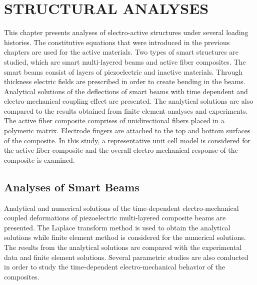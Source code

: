 %
%
%
\chapter{\uppercase{STRUCTURAL ANALYSES}}  
\label{section:structural_analyses}
This chapter presents analyses of electro-active structures under several loading histories.
The constitutive equations that were introduced in the previous chapters are used for the active materials.
Two types of smart structures are studied, which are smart multi-layered beams and active fiber composites.
The smart beams consist of layers of piezoelectric and inactive materials.
Through thickness electric fields are prescribed in order to create bending in the beams.
Analytical solutions of the deflections of smart beams with time dependent and electro-mechanical coupling effect are presented.
The analytical solutions are also compared to the results obtained from finite element analyses and experiments.
The active fiber composite comprises of unidirectional fibers placed in a polymeric matrix.
Electrode fingers are attached to the top and bottom surfaces of the composite.
In this study, a representative unit cell model is considered for the active fiber composite and the overall electro-mechanical response of the composite is examined. \\

\section{Analyses of Smart Beams}
Analytical and numerical solutions of the time-dependent electro-mechanical coupled deformations of piezoelectric multi-layered composite beams are presented. 
The Laplace transform method is used to obtain the analytical solutions while finite element method is considered for the numerical solutions.
The results from the analytical solutions are compared with the experimental data and finite element solutions.
Several parametric studies are also conducted in order to study the time-dependent electro-mechanical behavior of the composites.


